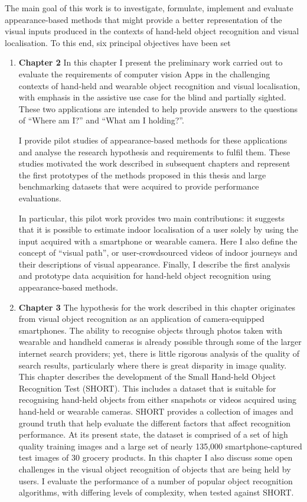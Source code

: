 The main goal of this work is to investigate, formulate, implement and evaluate appearance-based methods that might provide a better representation of the visual inputs produced in the contexts of hand-held object recognition and visual localisation. To this end, six principal objectives have been set


\begin{enumerate}

\item \textbf{Chapter 2} In this chapter I present the preliminary work carried out to evaluate the requirements of computer vision Apps in the challenging contexts of hand-held and wearable object recognition and visual localisation, with emphasis in the assistive use case for the blind and partially sighted. These two applications are intended to help provide answers to the questions of ``Where am I?'' and ``What am I holding?''.

I provide pilot studies of appearance-based methods for these applications and analyse the research hypothesis and requirements to fulfil them. These studies motivated the work described in subsequent chapters and represent the first prototypes of the methods proposed in this thesis and large benchmarking datasets that were acquired to provide performance evaluations.

In particular, this pilot work provides two main contributions: it suggests that it is possible to estimate indoor localisation of a user solely by using the input acquired with a smartphone or wearable camera. Here I also define the concept of ``visual path'', or user-crowdsourced videos of indoor journeys and their descriptions of visual appearance. Finally, I describe the first analysis and prototype data acquisition for hand-held object recognition using appearance-based methods.


\item \textbf{Chapter 3} The hypothesis for the work described in this chapter originates from visual object recognition as an application of camera-equipped smartphones. The ability to recognise objects through photos taken with wearable and handheld cameras is already possible through some of the larger internet search providers; yet, there is little rigorous analysis of the quality of search results, particularly where there is great disparity in image quality. This chapter describes the development of the Small Hand-held Object Recognition Test (SHORT). This includes a dataset that is suitable for recognising hand-held objects from either snapshots or videos acquired using hand-held or wearable cameras. SHORT provides a collection of images and ground truth that help evaluate the different factors that affect recognition performance. At its present state, the dataset is comprised of a set of high quality training images and a large set of nearly 135,000 smartphone-captured test images of 30 grocery products. In this chapter I also discuss some open challenges in the visual object recognition of objects that are being held by users. I evaluate the performance of a number of popular object recognition algorithms, with differing levels of complexity, when tested against SHORT.


\end{enumerate}

